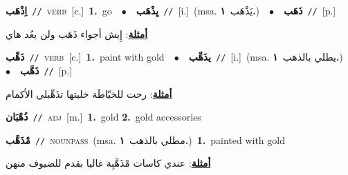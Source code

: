 \documentclass[10pt,a4paper,twoside]{article} %
\begin{document}
\begin{multicols}{2}
{{{{{{{{\setlength\topsep{0pt}\textbf{\foreignlanguage{arabic}{اِذْهَب}}\ {\color{gray}\texttt{//}\color{black}}\ \textsc{verb}\ [c.]\ \textbf{1.}~go\ \ $\bullet$\ \ \setlength\topsep{0pt}\textbf{\foreignlanguage{arabic}{يِذْهَب}}\ {\color{gray}\texttt{//}\color{black}}\ [i.]\ \color{gray}(msa. \foreignlanguage{arabic}{يَذْهَب}~\foreignlanguage{arabic}{\textbf{١.}})\color{black}\ \ $\bullet$\ \ \setlength\topsep{0pt}\textbf{\foreignlanguage{arabic}{ذَهَب}}\ {\color{gray}\texttt{//}\color{black}}\ [p.]\  \begin{flushright}\color{gray}\foreignlanguage{arabic}{\textbf{\underline{\foreignlanguage{arabic}{أمثلة}}}: إِيش أجواء ذَهَب ولن يعُد هاي}\end{flushright}\color{black}} \vspace{2mm}

{\setlength\topsep{0pt}\textbf{\foreignlanguage{arabic}{ذَهِّب}}\ {\color{gray}\texttt{//}\color{black}}\ \textsc{verb}\ [c.]\ \textbf{1.}~paint with gold\ \ $\bullet$\ \ \setlength\topsep{0pt}\textbf{\foreignlanguage{arabic}{يذَهِّب}}\ {\color{gray}\texttt{//}\color{black}}\ [i.]\ \color{gray}(msa. \foreignlanguage{arabic}{يطلي بالذهب}~\foreignlanguage{arabic}{\textbf{١.}})\color{black}\ \ $\bullet$\ \ \setlength\topsep{0pt}\textbf{\foreignlanguage{arabic}{ذَهَّب}}\ {\color{gray}\texttt{//}\color{black}}\ [p.]\  \begin{flushright}\color{gray}\foreignlanguage{arabic}{\textbf{\underline{\foreignlanguage{arabic}{أمثلة}}}: رحت للخيّاطَة خليتها تذَهِّبلي الأكمام}\end{flushright}\color{black}} \vspace{2mm}

{\setlength\topsep{0pt}\textbf{\foreignlanguage{arabic}{ذُهْبَان}}\ {\color{gray}\texttt{//}\color{black}}\ \textsc{adj}\ [m.]\ \textbf{1.}~gold  \textbf{2.}~gold accessories\ 

{\setlength\topsep{0pt}\textbf{\foreignlanguage{arabic}{مْذَهَّب}}\ {\color{gray}\texttt{//}\color{black}}\ \textsc{noun\textunderscore pass}\ \color{gray}(msa. \foreignlanguage{arabic}{مطلي بالذهب}~\foreignlanguage{arabic}{\textbf{١.}})\color{black}\ \textbf{1.}~painted with gold\  \begin{flushright}\color{gray}\foreignlanguage{arabic}{\textbf{\underline{\foreignlanguage{arabic}{أمثلة}}}: عندي كاسات مْذَهَّبِة غاليا بقدم للضيوف منهن}\end{flushright}\color{black}} \vspace{2mm}

}}}}}}}}
\end{multicols}
\end{document}
